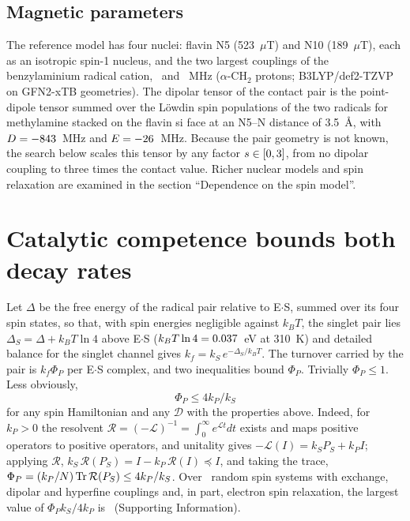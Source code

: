 \documentclass[journal=jpcbfk,manuscript=article,layout=traditional]{achemso}
\begin{document}
\subsection{Magnetic parameters}

The reference model has four nuclei: flavin N5 (523~$\mu$T) and N10
(189~$\mu$T), each as an isotropic spin-1 nucleus,\cite{Lee2014} and the two
largest couplings of the benzylaminium radical cation, \aBenzOne\ and
\aBenzTwo~MHz ($\alpha$-CH$_2$ protons; B3LYP/def2-TZVP on GFN2-xTB
geometries\cite{Bannwarth2019}). The dipolar tensor of the contact pair is the
point-dipole tensor summed over the Löwdin spin populations of the two radicals
for methylamine stacked on the flavin si face at an N5--N distance of
3.5~\AA, with $D = -843$~MHz and $E = -26$~MHz. Because the pair
geometry is not known, the search below scales this tensor by any factor
$s\in[0,3]$, from no dipolar coupling to three times the contact value.
Richer nuclear models and spin relaxation are examined in the section
``Dependence on the spin model''.

\section{Catalytic competence bounds both decay rates}

Let $\Delta$ be the free energy of the radical pair relative to E$\cdot$S, summed
over its four spin states, so that, with spin energies negligible against
$k_BT$, the singlet pair lies $\Delta_S = \Delta + k_BT\ln 4$ above E$\cdot$S
($k_BT\ln4 = 0.037$~eV at 310~K) and detailed balance for the singlet channel gives
$k_f = k_S\,e^{-\Delta_S/k_BT}$. The turnover carried by the pair is $k_f\Phi_P$
per E$\cdot$S complex, and two inequalities bound $\Phi_P$. Trivially
$\Phi_P\le1$. Less obviously,
\begin{equation}
\Phi_P \le 4k_P/k_S
\label{eq:phibound}
\end{equation}
for any spin Hamiltonian and any $\mathcal D$ with the properties above. Indeed,
for $k_P>0$ the resolvent
$\mathcal R = (-\mathcal L)^{-1} = \int_0^\infty e^{\mathcal Lt}dt$ exists and
maps positive operators to positive operators, and unitality gives
$-\mathcal L(I) = k_SP_S + k_PI$; applying $\mathcal R$,
$k_S\,\mathcal R(P_S) = I - k_P\,\mathcal R(I) \preceq I$, and taking the trace,
$\Phi_P = (k_P/N)\,{\rm Tr}\,\mathcal R(P_S)\le 4k_P/k_S$. Over
\nBoundTest\ random spin systems with exchange, dipolar and hyperfine couplings
and, in part, electron spin relaxation, the largest value of $\Phi_Pk_S/4k_P$ is
\maxBoundRatio\ (Supporting Information).
\end{document}
